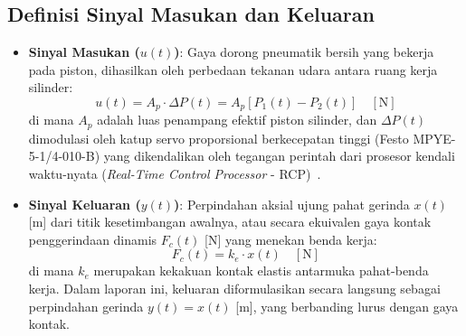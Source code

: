 \documentclass[journal]{IEEEtran}
\begin{document}
\subsection{Definisi Sinyal Masukan dan Keluaran}
\begin{itemize}
    \item \textbf{Sinyal Masukan ($u(t)$)}: Gaya dorong pneumatik bersih yang bekerja pada piston, dihasilkan oleh perbedaan tekanan udara antara ruang kerja silinder:
    \begin{equation}
        u(t) = A_p \cdot \Delta P(t) = A_p [P_1(t) - P_2(t)] \quad [\text{N}]
        \label{eq:input_def}
    \end{equation}
    di mana $A_p$ adalah luas penampang efektif piston silinder, dan $\Delta P(t)$ dimodulasi oleh katup servo proporsional berkecepatan tinggi (Festo MPYE-5-1/4-010-B) yang dikendalikan oleh tegangan perintah dari prosesor kendali waktu-nyata (\textit{Real-Time Control Processor} - RCP)~\cite{yang2026signal}.
    
    \item \textbf{Sinyal Keluaran ($y(t)$)}: Perpindahan aksial ujung pahat gerinda $x(t)$ [m] dari titik kesetimbangan awalnya, atau secara ekuivalen gaya kontak penggerindaan dinamis $F_c(t)$ [N] yang menekan benda kerja:
    \begin{equation}
        F_c(t) = k_e \cdot x(t) \quad [\text{N}]
        \label{eq:output_def}
    \end{equation}
    di mana $k_e$ merupakan kekakuan kontak elastis antarmuka pahat-benda kerja. Dalam laporan ini, keluaran diformulasikan secara langsung sebagai perpindahan gerinda $y(t) = x(t)$ [m], yang berbanding lurus dengan gaya kontak.
\end{itemize}
\end{document}
